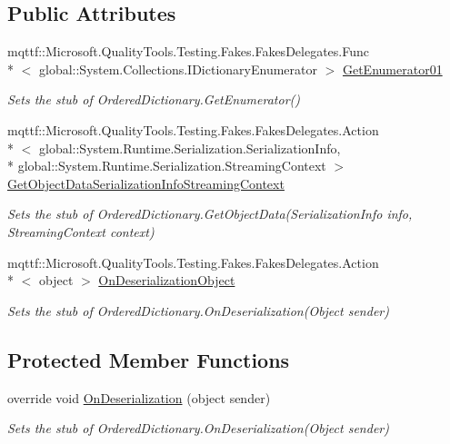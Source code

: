 \subsection*{Public Attributes}
\begin{DoxyCompactItemize}
\item 
mqttf\-::\-Microsoft.\-Quality\-Tools.\-Testing.\-Fakes.\-Fakes\-Delegates.\-Func\\*
$<$ global\-::\-System.\-Collections.\-I\-Dictionary\-Enumerator $>$ \hyperlink{class_system_1_1_collections_1_1_specialized_1_1_fakes_1_1_stub_ordered_dictionary_a7e52efed0a0f4ab696e66f72f31304d6}{Get\-Enumerator01}
\begin{DoxyCompactList}\small\item\em Sets the stub of Ordered\-Dictionary.\-Get\-Enumerator()\end{DoxyCompactList}\item 
mqttf\-::\-Microsoft.\-Quality\-Tools.\-Testing.\-Fakes.\-Fakes\-Delegates.\-Action\\*
$<$ global\-::\-System.\-Runtime.\-Serialization.\-Serialization\-Info, \\*
global\-::\-System.\-Runtime.\-Serialization.\-Streaming\-Context $>$ \hyperlink{class_system_1_1_collections_1_1_specialized_1_1_fakes_1_1_stub_ordered_dictionary_adc9bfe3cc1623cf60d0b2b117ada4498}{Get\-Object\-Data\-Serialization\-Info\-Streaming\-Context}
\begin{DoxyCompactList}\small\item\em Sets the stub of Ordered\-Dictionary.\-Get\-Object\-Data(\-Serialization\-Info info, Streaming\-Context context)\end{DoxyCompactList}\item 
mqttf\-::\-Microsoft.\-Quality\-Tools.\-Testing.\-Fakes.\-Fakes\-Delegates.\-Action\\*
$<$ object $>$ \hyperlink{class_system_1_1_collections_1_1_specialized_1_1_fakes_1_1_stub_ordered_dictionary_a188df025d0164bcbb829579b53f3edfa}{On\-Deserialization\-Object}
\begin{DoxyCompactList}\small\item\em Sets the stub of Ordered\-Dictionary.\-On\-Deserialization(\-Object sender)\end{DoxyCompactList}\end{DoxyCompactItemize}
\subsection*{Protected Member Functions}
\begin{DoxyCompactItemize}
\item 
override void \hyperlink{class_system_1_1_collections_1_1_specialized_1_1_fakes_1_1_stub_ordered_dictionary_ade86e7cf3e31ad055ba90eceb822b86a}{On\-Deserialization} (object sender)
\begin{DoxyCompactList}\small\item\em Sets the stub of Ordered\-Dictionary.\-On\-Deserialization(\-Object sender)\end{DoxyCompactList}\end{DoxyCompactItemize}
